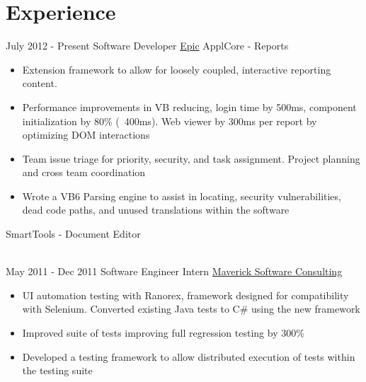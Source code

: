 \documentclass[letterpaper]{twentysecondcv} %
\begin{document}
\makeprofile %


\section{Experience}

\begin{twenty} %
\twentyitem
    	{July 2012 -}
		{Present}
        {Software Developer}
        {\href{https://www.epic.com/}{Epic}}
        {ApplCore - Reports}
        {\begin{itemize}
   		\item Extension framework to allow for loosely coupled, interactive reporting content.
   		
   		\item Performance improvements in VB reducing, login time by 500ms, component initialization by 80\% (~400ms). Web viewer by 300ms per report by optimizing DOM interactions
   		
   		\item Team issue triage for priority, security, and task assignment. Project planning and cross team coordination
   		
   		\item Wrote a VB6 Parsing engine to assist in locating, security vulnerabilities, dead code paths, and unused translations within the software
        \end{itemize}}
\twentyitem
{}
{}
{}
{}
{SmartTools - Document Editor}
{\begin{itemize}
\end{itemize}}
        \\
	\twentyitem
		{May 2011 -}
		{Dec 2011}
        {Software Engineer Intern}
        {\href{http://www.mavericksoftware.com/}{Maverick Software Consulting}}
        {}
        {
        {\begin{itemize}
        \item UI automation testing with Ranorex, framework designed for compatibility with Selenium. Converted existing Java tests to C\# using the new framework
        \item Improved suite of tests improving full regression testing by 300\%
        
        \item Developed a testing framework to allow distributed execution of tests within the testing suite
        

\end{itemize}}}
\end{twenty}
\end{document}
